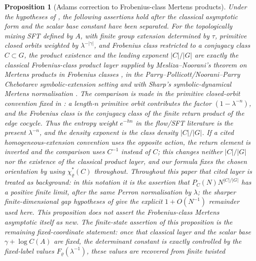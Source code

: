 \documentclass[11pt,a4paper]{amsart}
\theoremstyle{plain}
\newtheorem{proposition}[theorem]{Proposition}
\theoremstyle{definition}
\theoremstyle{remark}
\begin{document}
\begin{proposition}[Adams correction to Frobenius-class Mertens products]
  \label{prop:class-product-comparison}
  \label{thm:class-product-comparison}
  Under the hypotheses of , the
  following assertions hold after the classical asymptotic form and the scalar
  base constant have been separated.  For the topologically mixing SFT defined
  by \(A\), with finite group extension determined by \(\tau\), primitive
  closed orbits weighted by \(\lambda^{-|\gamma|}\), and Frobenius class
  restricted to a conjugacy class \(C\subset G\), the product existence and the
  leading exponent \(|C|/|G|\) are exactly the classical Frobenius-class
  product layer supplied by Mesliza--Noorani's theorem on Mertens products in
  Frobenius classes \cite{MeslizaNoorani1999FrobeniusMertens}, in the
  Parry--Pollicott/Noorani--Parry Chebotarev symbolic-extension setting and
  with Sharp's symbolic-dynamical Mertens normalisation
  \cite{ParryPollicott1986Chebotarev,NooraniParry1992ChebotarevShifts,Sharp1991Mertens}.
  The comparison is made in the primitive closed-orbit convention fixed in
  : a length-\(n\) primitive orbit contributes
  the factor \((1-\lambda^{-n})\), and the Frobenius class is the conjugacy
  class of the finite return product of the edge cocycle.  Thus the entropy
  weight \(e^{-hn}\) in the flow/SFT literature is the present
  \(\lambda^{-n}\), and the density exponent is the class density
  \(|C|/|G|\).  If a cited homogeneous-extension convention uses the opposite
  action, the return element is inverted and the comparison uses \(C^{-1}\)
  instead of \(C\); this changes neither \(|C|/|G|\) nor the existence of the
  classical product layer, and our formula fixes the chosen orientation by
  using \(\chi_\varrho^\ast(C)\) throughout.
  Throughout this paper that cited layer is treated as background: in this
  notation it is the assertion that
  \(P_C(N)N^{|C|/|G|}\) has a positive finite limit, after the same Perron
  normalisation by \(\lambda\); the sharper finite-dimensional gap hypotheses
  of  give the explicit
  \(1+O(N^{-1})\) remainder used here.  This proposition does not assert the
  Frobenius-class Mertens asymptotic itself as new.  The finite-state assertion of this
  proposition is the remaining fixed-coordinate statement: once that classical
  layer and the scalar base \(\gamma+\log C(A)\) are fixed, the determinant
  constant is exactly controlled by the fixed-label values
  \(F_\varrho(\lambda^{-1})\), these values are recovered from finite twisted

\end{proposition}
\end{document}

